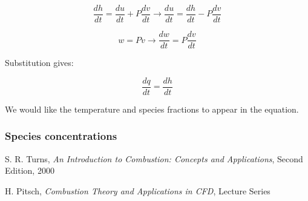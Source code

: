 \documentclass[10pt,twocolumn]{article}
\begin{document}
\begin{equation}
\frac{dh}{dt} = \frac{du}{dt} + P \frac{dv}{dt} \rightarrow \frac{du}{dt} = \frac{dh}{dt} - P \frac{dv}{dt}
\end{equation}

\begin{equation}
w = Pv \rightarrow \frac{d w}{dt} = P \frac{dv}{dt} 
\end{equation}

Substitution gives:

\begin{equation}
\frac{dq}{dt} = \frac{dh}{dt}
\end{equation}

We would like the temperature and species fractions to appear in the equation.

\subsubsection{Species concentrations}










\thebibliography{}

 S. R. Turns, \textit{An Introduction to Combustion: Concepts and Applications}, Second Edition, 2000 \label{bib:turns}

 H. Pitsch, \textit{Combustion Theory and Applications in CFD}, Lecture Series \label{bib:pitsch}

\label{bib:pope}
\end{document}
